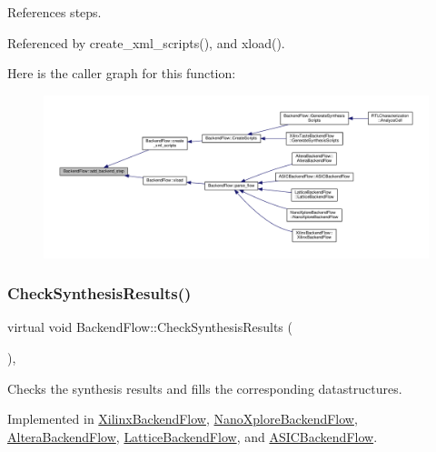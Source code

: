 References steps.



Referenced by create\+\_\+xml\+\_\+scripts(), and xload().

Here is the caller graph for this function\+:
\nopagebreak
\begin{figure}[H]
\begin{center}
\leavevmode
\includegraphics[width=350pt]{da/d75/classBackendFlow_af68bbc810207b55865e16f5ef0b4a043_icgraph}
\end{center}
\end{figure}
\mbox{\label{classBackendFlow_ad2096d43b7c9c47611d719188215f23f}} 
\subsubsection{\texorpdfstring{Check\+Synthesis\+Results()}{CheckSynthesisResults()}}
{\footnotesize\ttfamily virtual void Backend\+Flow\+::\+Check\+Synthesis\+Results (\begin{DoxyParamCaption}{ }\end{DoxyParamCaption})\hspace{0.3cm}{\ttfamily [protected]}, {}}



Checks the synthesis results and fills the corresponding datastructures. 



Implemented in \hyperlink{classXilinxBackendFlow_a4c059a8e048f5780fa09f00ff7faf817}{Xilinx\+Backend\+Flow}, \hyperlink{classNanoXploreBackendFlow_ab62a47ac25b6bb973d3612feee8c14b3}{Nano\+Xplore\+Backend\+Flow}, \hyperlink{classAlteraBackendFlow_a36da7a0f6807798fbbb334b6cb5d4677}{Altera\+Backend\+Flow}, \hyperlink{classLatticeBackendFlow_a31267aeb4a44638daab713102fe01306}{Lattice\+Backend\+Flow}, and \hyperlink{classASICBackendFlow_a1c6c74532caa4054624b4ffeac49114f}{A\+S\+I\+C\+Backend\+Flow}.



